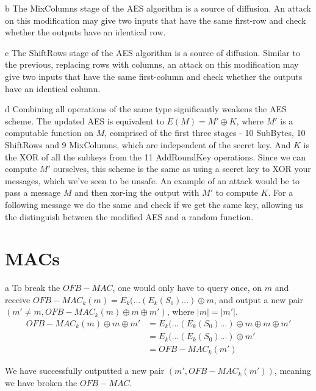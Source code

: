 \documentclass{article}
\begin{document}
\begin{paragraph}
	b The MixColumns stage of the AES algorithm is a source of diffusion.
	An attack on this modification may give two inputs that have the same first-row and
	check whether the outputs have an identical row.
\end{paragraph}

\begin{paragraph}
	c The ShiftRows stage of the AES algorithm is a source of diffusion.
	Similar to the previous, replacing rows with columns, an attack on this modification
	 may give two inputs that have the same first-column and check whether the outputs
	 have an identical column.
\end{paragraph}

\begin{paragraph}
	d Combining all operations of the same type significantly weakens the AES scheme.
	The updated AES is equivalent to ${E(M) = M'\oplus K}$, where $M'$ is a computable function
	on $M$, comprised of the first three stages - 10 SubBytes, 10 ShiftRows and 9 MixColumns, which
	are independent of the secret key. And $K$ is the XOR of all the subkeys
	from the 11 AddRoundKey operations. Since we can compute $M'$ ourselves, this scheme is 
	the same as using a secret key to XOR your messages, which we've seen to be unsafe.
	An example of an attack would be to pass a message $M$ and then xor-ing the output with
	$M'$ to compute $K$. For a following message we do the same and check if we get the 
	same key, allowing us the distinguish between the modified AES and a random function.

\end{paragraph}

\section{MACs}
\begin{paragraph}
	a To break the $OFB-MAC$, one would only have to query once, on $m$ and receive $OFB-MAC_k(m) = E_k(...(E_k(S_0)...) \oplus m$, and output a new pair $(m' \neq m, OFB-MAC_k(m) \oplus m \oplus m')$, where $|m| = |m'|$.
	\begin{align*}
	    OFB-MAC_k(m) \oplus m \oplus m' &= E_k(...(E_k(S_0)...) \oplus m \oplus m \oplus m'\\
	    &= E_k(...(E_k(S_0)...) \oplus m'\\
	    &= OFB-MAC_k(m')
	\end{align*}
	
	We have successfully outputted a new pair $(m', OFB-MAC_k(m'))$, meaning we have broken the $OFB-MAC$.
\end{paragraph}
\end{document}
